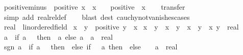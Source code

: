 \begin{isabellebody}
\isamarkupfalse%
%
\endisatagproof
{\isafoldproof}%
%
\isadelimproof
\isanewline
%
\endisadelimproof
\isanewline
{}\isamarkupfalse%
\ positive{\isacharunderscore}{\kern0pt}minus{\isacharcolon}{\kern0pt}\ {\isachardoublequoteopen}{\isasymnot}\ positive\ x\ {\isasymLongrightarrow}\ x\ {\isasymnoteq}\ {}\ {\isasymLongrightarrow}\ positive\ {\isacharparenleft}{\kern0pt}{\isacharminus}{\kern0pt}\ x{\isacharparenright}{\kern0pt}{\isachardoublequoteclose}\isanewline
%
\isadelimproof
\ \ %
\endisadelimproof
%
\isatagproof
{}\isamarkupfalse%
\ transfer\isanewline
\ \ \isamarkupfalse%
\ {\isacharparenleft}{\kern0pt}simp\ add{\isacharcolon}{\kern0pt}\ realrel{\isacharunderscore}{\kern0pt}def{\isacharparenright}{\kern0pt}\isanewline
\ \ \isamarkupfalse%
\ {\isacharparenleft}{\kern0pt}blast\ dest{\isacharcolon}{\kern0pt}\ cauchy{\isacharunderscore}{\kern0pt}not{\isacharunderscore}{\kern0pt}vanishes{\isacharunderscore}{\kern0pt}cases{\isacharparenright}{\kern0pt}\isanewline
\ \ \isamarkupfalse%
%
\endisatagproof
{\isafoldproof}%
%
\isadelimproof
\isanewline
%
\endisadelimproof
\isanewline
{}\isamarkupfalse%
\ real\ {\isacharcolon}{\kern0pt}{\isacharcolon}{\kern0pt}\ linordered{\isacharunderscore}{\kern0pt}field\isanewline
{}\isanewline
\isanewline
{}\isamarkupfalse%
\ {\isachardoublequoteopen}x\ {\isacharless}{\kern0pt}\ y\ {\isasymlongleftrightarrow}\ positive\ {\isacharparenleft}{\kern0pt}y\ {\isacharminus}{\kern0pt}\ x{\isacharparenright}{\kern0pt}{\isachardoublequoteclose}\isanewline
\isanewline
{}\isamarkupfalse%
\ {\isachardoublequoteopen}x\ {\isasymle}\ y\ {\isasymlongleftrightarrow}\ x\ {\isacharless}{\kern0pt}\ y\ {\isasymor}\ x\ {\isacharequal}{\kern0pt}\ y{\isachardoublequoteclose}\ \ x\ y\ {\isacharcolon}{\kern0pt}{\isacharcolon}{\kern0pt}\ real\isanewline
\isanewline
{}\isamarkupfalse%
\ {\isachardoublequoteopen}{\isasymbar}a{\isasymbar}\ {\isacharequal}{\kern0pt}\ {\isacharparenleft}{\kern0pt}if\ a\ {\isacharless}{\kern0pt}\ {}\ then\ {\isacharminus}{\kern0pt}\ a\ else\ a{\isacharparenright}{\kern0pt}{\isachardoublequoteclose}\ \ a\ {\isacharcolon}{\kern0pt}{\isacharcolon}{\kern0pt}\ real\isanewline
\isanewline
{}\isamarkupfalse%
\ {\isachardoublequoteopen}sgn\ a\ {\isacharequal}{\kern0pt}\ {\isacharparenleft}{\kern0pt}if\ a\ {\isacharequal}{\kern0pt}\ {}\ then\ {}\ else\ if\ {}\ {\isacharless}{\kern0pt}\ a\ then\ {}\ else\ {\isacharminus}{\kern0pt}\ {}{\isacharparenright}{\kern0pt}{\isachardoublequoteclose}\ \ a\ {\isacharcolon}{\kern0pt}{\isacharcolon}{\kern0pt}\ real\isanewline

\end{isabellebody}
